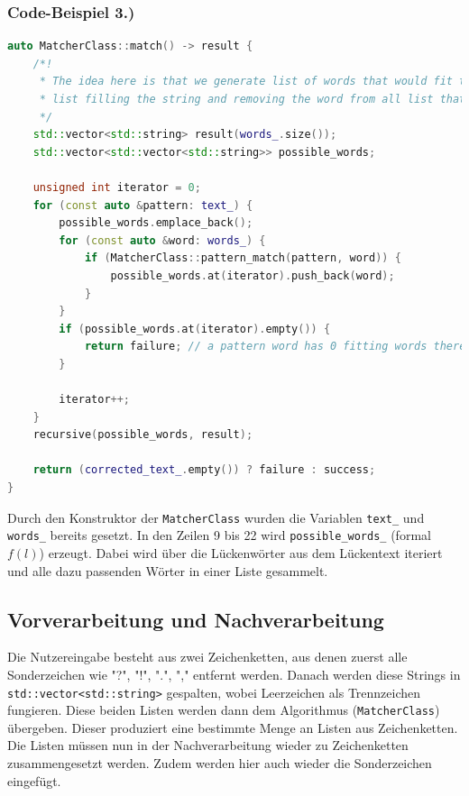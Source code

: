 \documentclass{article}
\begin{document}
\newpage
\subsubsection*{Code-Beispiel 3.)}
\lstset{language=C++}
\begin{lstlisting}[language=C++]
auto MatcherClass::match() -> result {
    /*!
     * The idea here is that we generate list of words that would fit that position and than start with the smallest
     * list filling the string and removing the word from all list that contain the word
     */
    std::vector<std::string> result(words_.size());
    std::vector<std::vector<std::string>> possible_words;

    unsigned int iterator = 0;
    for (const auto &pattern: text_) {
        possible_words.emplace_back();
        for (const auto &word: words_) {
            if (MatcherClass::pattern_match(pattern, word)) {
                possible_words.at(iterator).push_back(word);
            }
        }
        if (possible_words.at(iterator).empty()) {
            return failure; // a pattern word has 0 fitting words therefore this is not solveable
        }

        iterator++;
    }
    recursive(possible_words, result);

    return (corrected_text_.empty()) ? failure : success;
}
\end{lstlisting}
Durch den Konstruktor der \verb|MatcherClass| wurden die Variablen \verb|text_| und \verb|words_| bereits gesetzt. In den Zeilen 9 bis 22 wird \verb|possible_words_|  (formal $ f(l) $) erzeugt. Dabei wird über die Lückenwörter aus dem Lückentext iteriert und alle dazu passenden Wörter in einer Liste gesammelt.

\subsection*{Vorverarbeitung und Nachverarbeitung}

Die Nutzereingabe besteht aus zwei Zeichenketten, aus denen zuerst alle Sonderzeichen wie "?", "!", ".", "," entfernt werden. Danach werden diese Strings in \verb|std::vector<std::string>| gespalten, wobei Leerzeichen als Trennzeichen fungieren. Diese beiden Listen werden dann dem Algorithmus (\verb|MatcherClass|) übergeben. Dieser produziert eine bestimmte Menge an Listen aus Zeichenketten. Die Listen müssen nun in der Nachverarbeitung wieder zu Zeichenketten zusammengesetzt werden. Zudem werden hier auch wieder die Sonderzeichen eingefügt.
\end{document}
